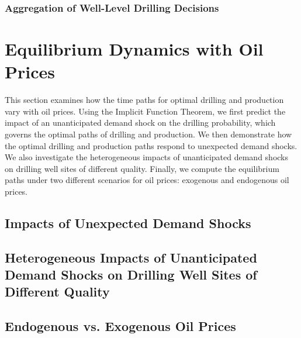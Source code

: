 \subsubsection{Aggregation of Well-Level Drilling Decisions}
\label{C3-SubSubSection:Aggregation-of-Well-Level-Drilling-Decisions}




\section{Equilibrium Dynamics with Oil Prices}
\label{C3-Section:Equilibrium-Dynamics-with-Oil-Prices}
This section examines how the time paths for optimal drilling and production vary with oil prices. Using the Implicit Function Theorem, we first predict the impact of an unanticipated demand shock on the drilling probability, which governs the optimal paths of drilling and production. We then demonstrate how the optimal drilling and production paths respond to unexpected demand shocks. We also investigate the heterogeneous impacts of unanticipated demand shocks on drilling well sites of different quality. Finally, we compute the equilibrium paths under two different scenarios for oil prices: exogenous and endogenous oil prices.


\subsection{Impacts of Unexpected Demand Shocks}
\label{C3-SubSection:Impacts-of-Unexpected-Demand-Shocks}


\subsection{Heterogeneous Impacts of Unanticipated Demand Shocks on Drilling Well Sites of Different Quality}
\label{C3-SubSection:Heterogeneous-Impacts-of-Unanticipated-Demand-Shocks-on-Drilling-Well-Sites-of-Different-Quality}


\subsection{Endogenous vs. Exogenous Oil Prices}
\label{C3-SubSection:Endogenous-vs-Exogenous-Oil-Prices}




